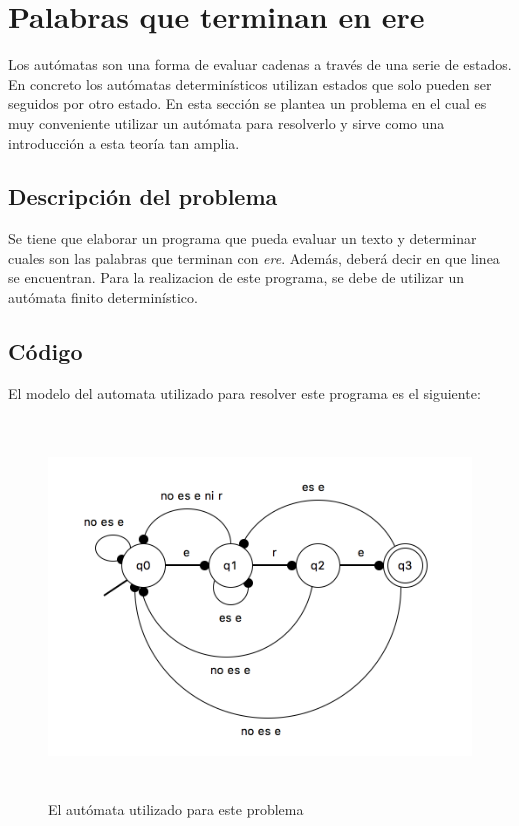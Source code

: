 \documentclass[12pt]{article}
\begin{document}
\newpage
\section{Palabras que terminan en ere}
Los autómatas son una forma de evaluar cadenas a través de una serie de estados. En concreto los autómatas determinísticos utilizan estados que solo pueden ser seguidos por otro estado. En esta sección se plantea un problema en el cual es muy conveniente utilizar un autómata para resolverlo y sirve como una introducción a esta teoría tan amplia.

\subsection{Descripción del problema}
Se tiene que elaborar un programa que pueda evaluar un texto y determinar cuales son las palabras que terminan con \textit{ere}. Además, deberá decir en que linea se encuentran. Para la realizacion de este programa, se debe de utilizar un autómata finito determinístico.


\subsection{Código}
El modelo del automata utilizado para resolver este programa es el siguiente:

\begin{figure}[H]
\includegraphics[width=\textwidth, height=10cm]{automata_ere}
\caption{El autómata utilizado para este problema}
\label{fig:automata_ere_modelo}
\end{figure}
\end{document}

